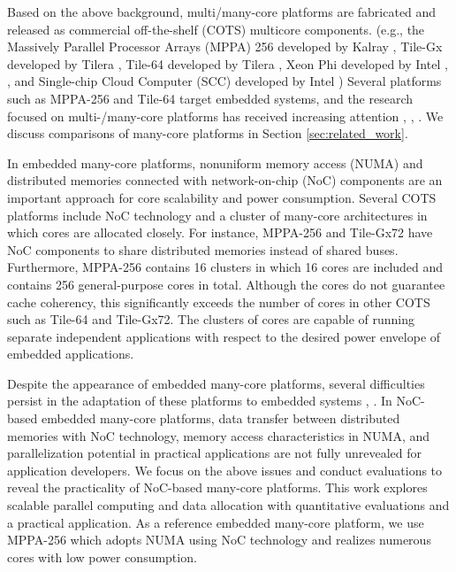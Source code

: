   Based on the above background, multi/many-core platforms are fabricated and released as commercial off-the-shelf (COTS) multicore components.
  (e.g., the Massively Parallel Processor Arrays (MPPA) 256 developed by Kalray \cite{de2014time}, Tile-Gx developed by Tilera \cite{ramey2011tile} \cite{schooler2010tile}, Tile-64 developed by Tilera \cite{bell2008tile64}, Xeon Phi developed by Intel \cite{chrysos2014intel}, \cite{chrysos2012intel}, and Single-chip Cloud Computer (SCC) developed by Intel \cite{baron2010single})
  Several platforms such as MPPA-256 and Tile-64 target embedded systems, and the research focused on multi-/many-core platforms has received increasing attention \cite{kanter2015kalray}, \cite{denet2017work}, \cite{perret2016predictable}.
  We discuss comparisons of many-core platforms in Section \ref{sec:related_work}.  
  
  In embedded many-core platforms, nonuniform memory access (NUMA) and distributed memories connected with network-on-chip (NoC) components are an important approach for core scalability and power consumption.
  Several COTS platforms include NoC technology and a cluster of many-core architectures in which cores are  allocated closely.
  For instance, MPPA-256 and Tile-Gx72 have NoC components to share distributed memories instead of shared buses.
  Furthermore, MPPA-256 contains 16 clusters in which 16 cores are included and contains 256 general-purpose cores in total.
  Although the cores do not guarantee cache coherency, this significantly exceeds the number of cores in other COTS such as Tile-64 and Tile-Gx72.  
  The clusters of cores are capable of running separate independent applications with respect to the desired power envelope of embedded applications.

  Despite the appearance of embedded many-core platforms, several difficulties persist in the adaptation of these platforms to embedded systems \cite{becker2016contention}, \cite{saidi2015shift}.
  In NoC-based embedded many-core platforms, data transfer between distributed memories with NoC technology, memory access characteristics in NUMA, and parallelization potential in practical applications are not fully unrevealed for application developers.
  We focus on the above issues and conduct evaluations to reveal the practicality of NoC-based many-core platforms.
  This work explores scalable parallel computing and data allocation with quantitative evaluations and a practical application.
  As a reference embedded many-core platform, we use MPPA-256 \cite{de2014time} which adopts NUMA using NoC technology and realizes numerous cores with low power consumption.  
  
